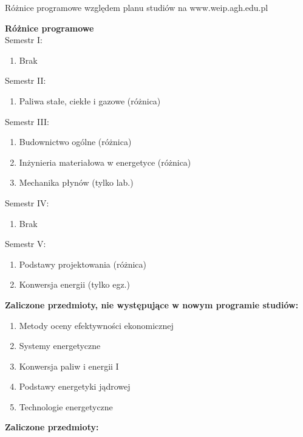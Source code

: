 \documentclass[a4paper,12pt]{article}
\begin{document}
\begin{center}
\Large{Różnice programowe względem planu studiów na www.weip.agh.edu.pl}
\end{center}
\vspace{20pt}
\textbf{Różnice programowe}\\
Semestr I:
\begin{enumerate}
\item Brak
\end{enumerate}
Semestr II:
\begin{enumerate}
\item Paliwa stałe, ciekłe i gazowe (różnica)
\end{enumerate}
Semestr III:
\begin{enumerate}
\item Budownictwo ogólne (różnica)
\item Inżynieria materiałowa w energetyce (różnica)
\item Mechanika płynów (tylko lab.)
\end{enumerate}
Semestr IV:
\begin{enumerate}
\item Brak
\end{enumerate}
Semestr V:
\begin{enumerate}
\item Podstawy projektowania (różnica)
\item Konwersja energii (tylko egz.)
\end{enumerate}
\vspace{20pt}
\textbf{Zaliczone przedmioty, nie występujące w nowym programie studiów:}
\begin{enumerate}
\item Metody oceny efektywności ekonomicznej
\item Systemy energetyczne
\item Konwersja paliw i energii I
\item Podstawy energetyki jądrowej
\item Technologie energetyczne
\end{enumerate}
\newpage
\textbf{Zaliczone przedmioty:}
\end{document}
